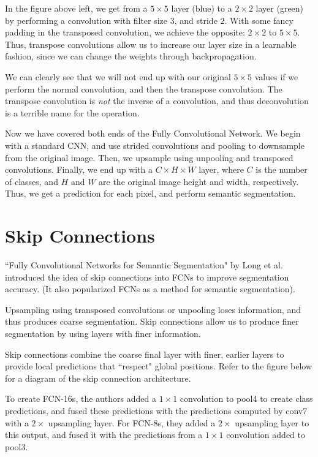 \documentclass{article}
\begin{document}
In the figure above left, we get from a $5\times5$ layer (blue) to a $2\times2$ layer (green) by performing a convolution with filter size $3$, and stride $2$. With some fancy padding in the transposed convolution, we achieve the opposite: $2\times2$ to $5\times5$. Thus, transpose convolutions allow us to increase our layer size in a learnable fashion, since we can change the weights through backpropagation.

We can clearly see that we will not end up with our original $5\times5$ values if we perform the normal convolution, and then the transpose convolution. The transpose convolution is \textit{not} the inverse of a convolution, and thus deconvolution is a terrible name for the operation.

Now we have covered both ends of the Fully Convolutional Network. We begin with a standard CNN, and use strided convolutions and pooling to downsample from the original image. Then, we upsample using unpooling and transposed convolutions. Finally, we end up with a $C\times H \times W$ layer, where $C$ is the number of classes, and $H$ and $W$ are the original image height and width, respectively. Thus, we get a prediction for each pixel, and perform semantic segmentation.

\section{Skip Connections}
``Fully Convolutional Networks for Semantic Segmentation" by Long et al. introduced the idea of skip connections into FCNs to improve segmentation accuracy. (It also popularized FCNs as a method for semantic segmentation).

Upsampling using transposed convolutions or unpooling loses information, and thus produces coarse segmentation. Skip connections allow us to produce finer segmentation by using layers with finer information.

Skip connections combine the coarse final layer with finer, earlier layers to provide local predictions that ``respect" global positions. Refer to the figure below for a diagram of the skip connection architecture.

To create FCN-16s, the authors added a $1\times1$ convolution to pool4 to create class predictions, and fused these predictions with the predictions computed by conv7 with a $2\times$ upsampling layer.
For FCN-8s, they added a $2\times$ upsampling layer to this output, and fused it with the predictions from a $1\times1$ convolution added to pool3.
\end{document}
